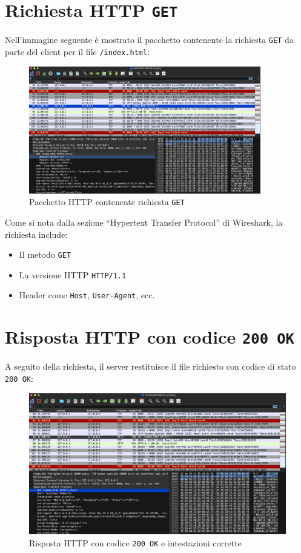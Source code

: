 \documentclass[a4paper,12pt]{report}
\begin{document}
\section{Richiesta HTTP \texttt{GET}}

Nell’immagine seguente è mostrato il pacchetto contenente la richiesta \texttt{GET} da parte del client per il file \texttt{/index.html}:

\begin{figure}[H]
    \centering
    \includegraphics[width=0.9\textwidth]{Images/getRequest.png}
    \caption{Pacchetto HTTP contenente richiesta \texttt{GET}}
\end{figure}

Come si nota dalla sezione “Hypertext Transfer Protocol” di Wireshark, la richiesta include:
\begin{itemize}
    \item Il metodo \texttt{GET}
    \item La versione HTTP \texttt{HTTP/1.1}
    \item Header come \texttt{Host}, \texttt{User-Agent}, ecc.
\end{itemize}

\section{Risposta HTTP con codice \texttt{200 OK}}

A seguito della richiesta, il server restituisce il file richiesto con codice di stato \texttt{200 OK}:

\begin{figure}[H]
    \centering
    \includegraphics[width=1.0\textwidth]{Images/200.png}
    \caption{Risposta HTTP con codice \texttt{200 OK} e intestazioni corrette}
\end{figure}
\end{document}
